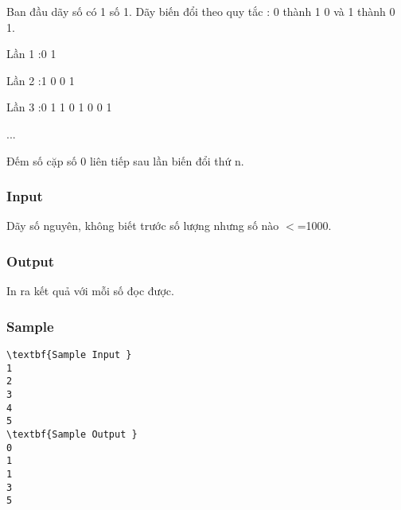 

Ban đầu dãy số có 1 số 1. Dãy biến đổi theo quy tắc : 0 thành 1 0 và 1 thành 0 1.

Lần 1 :0 1

Lần 2 :1 0 0 1

Lần 3 :0 1 1 0 1 0 0 1

...

Đếm số cặp số 0 liên tiếp sau lần biến đổi thứ n.

\subsubsection{Input}

Dãy số nguyên, không biết trước số lượng nhưng số nào $<$=1000.

\subsubsection{Output}

In ra kết quả với mỗi số đọc được.

\subsubsection{Sample}
\begin{verbatim}
\textbf{Sample Input }
1
2 
3 
4
5 
\textbf{Sample Output }
0
1 
1
3
5
\end{verbatim}